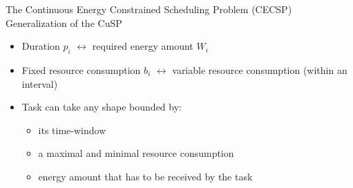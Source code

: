 \begin{frame}{The Continuous Energy Constrained Scheduling Problem (CECSP)}
   Generalization of the CuSP
   \begin{itemize}
     \vfill
   \item Duration $p_i$ $\leftrightarrow$ required energy amount $W_i$
     \vfill
   \item Fixed resource consumption $b_i$ $\leftrightarrow$ variable resource consumption (within an interval)
     \vfill  
   \item Task can take any shape bounded by:
     \begin{itemize}
     \item<2-> its time-window
     \item<3-> a maximal and minimal resource consumption
     \item<4-> energy amount that has to be received by the task
     \end{itemize}
     \vfill
   \end{itemize}
   \begin{overlayarea}{\textwidth}{3cm}
      {
       \vfill
       \begin{columns}
         \begin{column}{0.45\linewidth}
           
         \end{column}
         \begin{column}{0.45\linewidth}
           
         \end{column}
       \end{columns}
       \vfill}
   \end{overlayarea}
 \end{frame}
 
